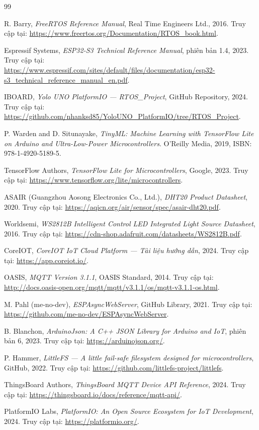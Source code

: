 
\normalfont
\begin{thebibliography}{99}
\label{bibliography}

R. Barry, \textit{FreeRTOS Reference Manual}, Real Time Engineers Ltd., 2016.
Truy cập tại: \url{https://www.freertos.org/Documentation/RTOS_book.html}.

Espressif Systems, \textit{ESP32-S3 Technical Reference Manual}, phiên bản 1.4, 2023.
Truy cập tại: \url{https://www.espressif.com/sites/default/files/documentation/esp32-s3_technical_reference_manual_en.pdf}.

IBOARD, \textit{Yolo UNO PlatformIO --- RTOS\_Project}, GitHub Repository, 2024.
Truy cập tại: \url{https://github.com/nhanksd85/YoloUNO_PlatformIO/tree/RTOS_Project}.

P. Warden and D. Situnayake, \textit{TinyML: Machine Learning with TensorFlow Lite on Arduino and Ultra-Low-Power Microcontrollers}.
O'Reilly Media, 2019, ISBN: 978-1-4920-5189-5.

TensorFlow Authors, \textit{TensorFlow Lite for Microcontrollers}, Google, 2023.
Truy cập tại: \url{https://www.tensorflow.org/lite/microcontrollers}.

ASAIR (Guangzhou Aosong Electronics Co., Ltd.), \textit{DHT20 Product Datasheet}, 2020.
Truy cập tại: \url{https://aqicn.org/air/sensor/spec/asair-dht20.pdf}.

Worldsemi, \textit{WS2812B Intelligent Control LED Integrated Light Source Datasheet}, 2016.
Truy cập tại: \url{https://cdn-shop.adafruit.com/datasheets/WS2812B.pdf}.

CoreIOT, \textit{CoreIOT IoT Cloud Platform --- Tài liệu hướng dẫn}, 2024.
Truy cập tại: \url{https://app.coreiot.io/}.

OASIS, \textit{MQTT Version 3.1.1}, OASIS Standard, 2014.
Truy cập tại: \url{http://docs.oasis-open.org/mqtt/mqtt/v3.1.1/os/mqtt-v3.1.1-os.html}.

M. Pahl (me-no-dev), \textit{ESPAsyncWebServer}, GitHub Library, 2021.
Truy cập tại: \url{https://github.com/me-no-dev/ESPAsyncWebServer}.

B. Blanchon, \textit{ArduinoJson: A C++ JSON Library for Arduino and IoT}, phiên bản 6, 2023.
Truy cập tại: \url{https://arduinojson.org/}.

P. Hammer, \textit{LittleFS --- A little fail-safe filesystem designed for microcontrollers}, GitHub, 2022.
Truy cập tại: \url{https://github.com/littlefs-project/littlefs}.

ThingsBoard Authors, \textit{ThingsBoard MQTT Device API Reference}, 2024.
Truy cập tại: \url{https://thingsboard.io/docs/reference/mqtt-api/}.

PlatformIO Labs, \textit{PlatformIO: An Open Source Ecosystem for IoT Development}, 2024.
Truy cập tại: \url{https://platformio.org/}.

\end{thebibliography}
